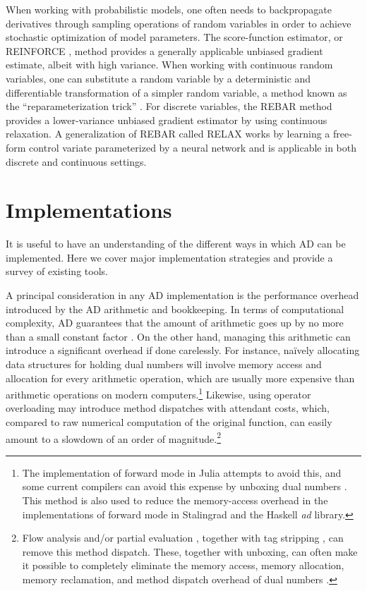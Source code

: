 \documentclass[twoside,11pt]{article}
\begin{document}
When working with probabilistic models, one often needs to backpropagate derivatives through sampling operations of random variables in order to achieve stochastic optimization of model parameters. The score-function estimator, or REINFORCE \citep{williams1992simple}, method provides a generally applicable unbiased gradient estimate, albeit with high variance. When working with continuous random variables, one can substitute a random variable by a deterministic and differentiable transformation of a simpler random variable, a method known as the ``reparameterization trick'' \citep{williams1992simple,kingma2014auto,rezende2014stochastic}. For discrete variables, the REBAR \citep{tucker2017rebar} method provides a lower-variance unbiased gradient estimator by using continuous relaxation. A generalization of REBAR called RELAX \citep{grathwohl2017backpropagation} works by learning a free-form control variate parameterized by a neural network and is applicable in both discrete and continuous settings.

\section{Implementations}
\label{SectionImplementations}

It is useful to have an understanding of the different ways in which AD can be implemented. Here we cover major implementation strategies and provide a survey of existing tools.

A principal consideration in any AD implementation is the performance overhead introduced by the AD arithmetic and bookkeeping. In terms of computational complexity, AD guarantees that the amount of arithmetic goes up by no more than a small constant factor \citep{Griewank2008}. On the other hand, managing this arithmetic can introduce a significant overhead if done carelessly. For instance, naïvely allocating data structures for holding dual numbers will involve memory access and allocation for every arithmetic operation, which are usually more expensive than arithmetic operations on modern computers.\footnote{The implementation of forward mode in Julia \citep{revels2016forward} attempts to avoid this, and some current compilers can avoid this expense by unboxing dual numbers \citep{leroy1997effectiveness, jones1993glasgow, jones1991unboxed, siskind2016efficient}. This method is also used to reduce the memory-access overhead in the implementations of forward mode in Stalingrad and the Haskell \emph{ad} library.} Likewise, using operator overloading may introduce method dispatches with attendant costs, which, compared to raw numerical computation of the original function, can easily amount to a slowdown of an order of magnitude.\footnote{Flow analysis \citep{shivers1991control} and/or partial evaluation \citep{jones1993partial}, together with tag stripping \citep{appel1989runtime, peterson1989untagged}, can remove this method dispatch. These, together with unboxing, can often make it possible to completely eliminate the memory access, memory allocation, memory reclamation, and method dispatch overhead of dual numbers \citep{siskind2016efficient}.}
\end{document}
